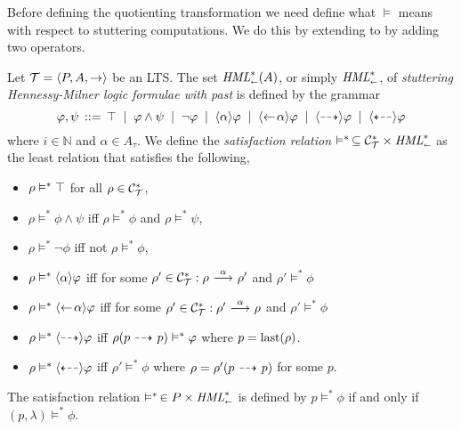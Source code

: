 Before defining the quotienting transformation we need define what $\vDash$ 
means with respect to stuttering computations.
We do this by extending \HMLpast{} to \HMLpp{} by adding
two operators.

\begin{definition}
    \label{dfn:hmlpast}
    Let $\mathcal{T}=\langle P,A,\rightarrow \rangle$ be an LTS. The set $\textit{HML}_\shortleftarrow^*(A)$,
    or simply $\textit{HML}_\shortleftarrow^*$, of
    \emph{stuttering Hennessy-Milner logic formulae with past}
    is defined by the grammar
    \[
        \varphi,\psi \,::=\, \top \;\;|\;\; \varphi\land\psi
                                \;\;|\;\; \neg\varphi
                                \;\;|\;\; \mbox{\ensuremath{\langle \alpha \rangle}} \varphi
                                \;\;|\;\; \mbox{\ensuremath{\langle\leftarrow\! \alpha \rangle}} \varphi
                                \;\;|\;\; \mbox{\ensuremath{\langle\stackrel{_{}}{\dashrightarrow}\rangle}} \varphi
                                \;\;|\;\; \mbox{\ensuremath{\langle\stackrel{_{}}{\dashleftarrow}\rangle}} \varphi
    \]
    where $i\in\mathbb{N}$ and $\alpha\in A_\tau$.
    We define the \emph{satisfaction relation} $\vDash^*\,\subseteq \mathcal{C}_{\mathcal{T}}^* \times \textit{HML}_\shortleftarrow^*$
    as the least relation that satisfies the following,
    \begin{itemize}
        \item $\rho\vDash^*\top$ for all $\rho\in\mathcal{C}_{\mathcal{T}}^*$,
        \item $\rho\vDash^*\phi\land\psi$ iff $\rho\vDash^*\phi$ and $\rho\vDash^*\psi$,
        \item $\rho\vDash^*\neg\phi$ iff not $\rho\vDash^*\phi$,
        \item $\rho\vDash^*\mbox{\ensuremath{\langle \alpha \rangle}}\varphi$ iff for some
              $\rho'\in\mathcal{C}_{\mathcal{T}}^* : \rho\ {\stackrel{{\alpha}}{\longrightarrow}}\ \rho'$ and $\rho'\vDash^*\phi$
        \item $\rho\vDash^*\mbox{\ensuremath{\langle\leftarrow\! \alpha \rangle}}\varphi$ iff for some
              $\rho'\in\mathcal{C}_{\mathcal{T}}^* : \rho'\ {\stackrel{{\alpha}}{\longrightarrow}}\ \rho$ and $\rho'\vDash^*\phi$
        \item $\rho\vDash^*\mbox{\ensuremath{\langle\stackrel{_{}}{\dashrightarrow}\rangle}}\varphi$ iff
              $\rho(p\ {\stackrel{_{}}{\dashrightarrow}}\  p) \vDash^* \varphi$ where $p=\operatorname{last}(\rho)$.
        \item $\rho\vDash^*\mbox{\ensuremath{\langle\stackrel{_{}}{\dashleftarrow}\rangle}}\varphi$ iff
              $\rho' \vDash^* \phi$ where $\rho = \rho'(p \ {\stackrel{_{}}{\dashrightarrow}}\  p)$ for some $p$.
    \end{itemize}
    The satisfaction relation $\vDash^*\,\in P\times\textit{HML}_\shortleftarrow^*$ is defined by
    $p\vDash^*\phi$ if and only if $(p,\lambda)\vDash^* \phi$.
\end{definition}

